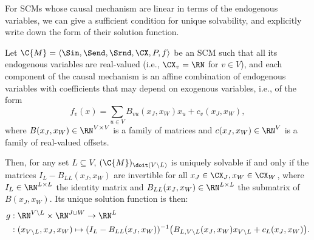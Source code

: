For SCMs whose causal mechanism are linear in terms of the endogenous variables, we can
give a sufficient condition for unique solvability, and explicitly write down the form
of their solution function.
\begin{Prp}\label{prp:linear_scms}
Let $\C{M}=\langle \Sin, \Send, \Srnd, \CX, P, f \rangle$ be an SCM such that all its
endogenous variables are real-valued (i.e., $\CX_v = \RN$ for $v \in V$), and each
component of the causal mechanism is an affine combination of endogenous variables
with coefficients that may depend on exogenous variables, i.e., of the form
$$
  f_v(x) = \sum_{u\in V} B_{vu}(x_J,x_W) x_u + c_v(x_J,x_W),
$$
where $B(x_J,x_W)\in\RN^{V \times V}$ is a family of matrices and
$c(x_J,x_W) \in \RN^V$ is a family of real-valued offsets.

Then, for any set $L \subseteq V$,
$(\C{M})_{\doit(V\setminus L)}$ is uniquely solvable if and only if the matrices 
$I_{L}-B_{LL}(x_J,x_W)$ are invertible for all $x_J \in \CX_J, x_W \in \CX_W$,
where $I_L \in \RN^{L \times L}$ the identity matrix and 
$B_{LL}(x_J,x_W) \in \RN^{L \times L}$ the submatrix of $B(x_J,x_W)$.
Its unique solution function is then:
  \begin{equation*}\begin{split}
    g &: \RN^{V\setminus L} \times \RN^{J\cup W} \to \RN^L \\
      &: (x_{V\setminus L},x_J,x_W) \mapsto (I_L - B_{LL}(x_J,x_W))^{-1} \big(B_{L,{V\setminus L}}(x_J,x_W) x_{V\setminus L} + c_{L}(x_J,x_W)\big).
  \end{split}\end{equation*}
\end{Prp}

